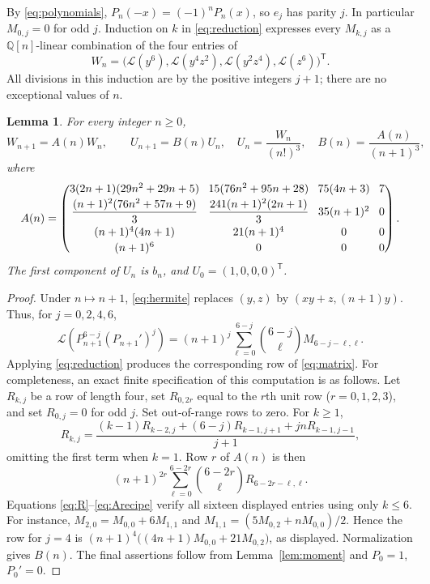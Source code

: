 \documentclass[11pt]{article}
\newtheorem{lemma}[theorem]{Lemma}
\newcommand{\Lfun}{\mathcal L}
\newcommand{\Q}{\mathbb Q}
\begin{document}
By \eqref{eq:polynomials}, $P_n(-x)=(-1)^nP_n(x)$, so $e_j$ has
parity $j$. In particular $M_{0,j}=0$ for odd $j$.
Induction on $k$ in \eqref{eq:reduction} expresses every $M_{k,j}$
as a $\Q[n]$-linear combination of the four entries of
\[
 W_n=\bigl(\Lfun(y^6),\Lfun(y^4z^2),\Lfun(y^2z^4),
                  \Lfun(z^6)\bigr)^{\mathsf T}.
\]
All divisions in this induction are by the positive integers $j+1$;
there are no exceptional values of $n$.

\begin{lemma}\label{lem:transfer}
For every integer $n\geq0$,
\begin{equation}\label{eq:transfer}
 W_{n+1}=A(n)W_n,\qquad
 U_{n+1}=B(n)U_n,\quad
 U_n=\frac{W_n}{(n!)^3},\quad B(n)=\frac{A(n)}{(n+1)^3},
\end{equation}
where
\begin{equation}\label{eq:matrix}
\setlength{\arraycolsep}{4pt}
 A(n)=\begin{pmatrix}
 3(2n+1)(29n^2+29n+5)&15(76n^2+95n+28)&75(4n+3)&7\\[2pt]
 \dfrac{(n+1)^2(76n^2+57n+9)}3&\dfrac{241(n+1)^2(2n+1)}3&35(n+1)^2&0\\[6pt]
 (n+1)^4(4n+1)&21(n+1)^4&0&0\\[2pt]
 (n+1)^6&0&0&0
 \end{pmatrix}.
\end{equation}
The first component of $U_n$ is $b_n$, and $U_0=(1,0,0,0)^{\mathsf T}$.
\end{lemma}
\begin{proof}
Under $n\mapsto n+1$, \eqref{eq:hermite} replaces
$(y,z)$ by $(xy+z,(n+1)y)$. Thus, for $j=0,2,4,6$,
\begin{equation}\label{eq:entryrecipe}
 \Lfun(P_{n+1}^{6-j}(P_{n+1}')^j)
 =(n+1)^j\sum_{\ell=0}^{6-j}\binom{6-j}{\ell}
 M_{6-j-\ell,\ell}.
\end{equation}
Applying \eqref{eq:reduction} produces the corresponding row of
\eqref{eq:matrix}. For completeness, an exact finite specification of
this computation is as follows. Let $R_{k,j}$ be a row of length four,
set $R_{0,2r}$ equal to the $r$th unit row ($r=0,1,2,3$), and set
$R_{0,j}=0$ for odd $j$. Set out-of-range rows to zero. For $k\geq1$,
\begin{equation}\label{eq:R}
 R_{k,j}=\frac{(k-1)R_{k-2,j}+(6-j)R_{k-1,j+1}
                         +jnR_{k-1,j-1}}{j+1},
\end{equation}
omitting the first term when $k=1$. Row $r$ of $A(n)$ is then
\begin{equation}\label{eq:Arecipe}
 (n+1)^{2r}\sum_{\ell=0}^{6-2r}\binom{6-2r}{\ell}
 R_{6-2r-\ell,\ell}.
\end{equation}
Equations \eqref{eq:R}--\eqref{eq:Arecipe} verify all sixteen displayed
entries using only $k\leq6$. For instance,
$M_{2,0}=M_{0,0}+6M_{1,1}$ and
$M_{1,1}=(5M_{0,2}+nM_{0,0})/2$. Hence the row for $j=4$ is
$(n+1)^4\bigl((4n+1)M_{0,0}+21M_{0,2}\bigr)$, as displayed.
Normalization gives $B(n)$. The final assertions follow from
Lemma~\ref{lem:moment} and $P_0=1$, $P_0'=0$.
\end{proof}
\end{document}

